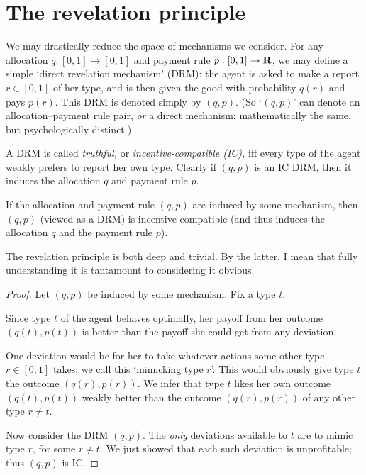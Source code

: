 \section{The revelation principle}
\label{sec:ch1:revelation}

We may drastically reduce the space of mechanisms we consider.
For any allocation $q : [0,1] \to [0,1]$ and payment rule $p : [0,1] \to \mathbf{R}$,
we may define a simple `direct revelation mechanism' (DRM):
the agent is asked to make a report $r \in [0,1]$ of her type,
and is then given the good with probability $q(r)$ and pays $p(r)$.
This DRM is denoted simply by $(q,p)$.
(So `$(q,p)$' can denote an allocation--payment rule pair,
\emph{or} a direct mechanism; mathematically the same, but psychologically distinct.)

A DRM is called \emph{truthful,} or \emph{incentive-compatible (IC),}
iff every type of the agent weakly prefers to report her own type.
Clearly if $(q,p)$ is an IC DRM, then it induces the allocation $q$ and payment rule $p$.

\begin{namedthm}
	\label{observation:rev}
	If the allocation and payment rule $(q,p)$ are induced by some mechanism,
	then $(q,p)$ (viewed as a DRM) is incentive-compatible
	(and thus induces the allocation $q$ and the payment rule $p$).
\end{namedthm}

The revelation principle is both deep and trivial.
By the latter, I mean that fully understanding it is tantamount to considering it obvious.

\begin{proof}
	Let $(q,p)$ be induced by some mechanism.
	Fix a type $t$.

	Since type $t$ of the agent behaves optimally,
	her payoff from her outcome $(q(t),p(t))$ is better than the payoff she could get from any deviation.

	One deviation would be for her to take whatever actions some other type $r \in [0,1]$ takes; we call this `mimicking type $r$'.
	This would obviously give type $t$ the outcome $(q(r),p(r))$.
	We infer that type $t$ likes her own outcome $(q(t),p(t))$ weakly better than the outcome $(q(r),p(r))$ of any other type $r \neq t$.

	Now consider the DRM $(q,p)$.
	The \emph{only} deviations available to $t$
	are to mimic type $r$, for some $r \neq t$.
	We just showed that each such deviation is unprofitable;
	thus $(q,p)$ is IC.
\end{proof}

